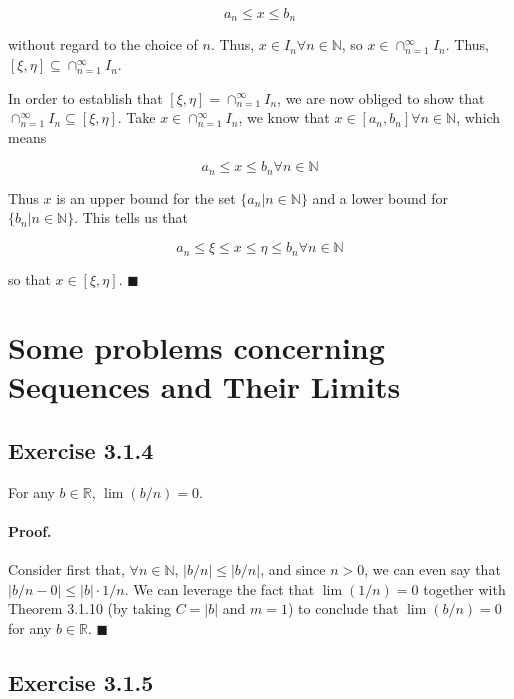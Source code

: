 \documentclass[paper=a4, fontsize=11pt]{scrartcl} %
\numberwithin{equation}{section} %
\numberwithin{figure}{section} %
\numberwithin{table}{section} %
\begin{document}
\begin{equation}
a_n \leq x \leq b_n
\end{equation}

without regard to the choice of $n$. Thus, $x \in I_n \forall n \in \mathbb{N}$, so $x \in \cap_{n=1}^{\infty} I_n$. Thus, $[\xi, \eta] \subseteq \cap_{n=1}^{\infty} I_n$.

\newcommand{\xieta}{[\xi,\eta]}
\newcommand{\capin}{\cap_{n=1}^{\infty} I_n}
\newcommand{\fanin}{\forall n \in \mathbb{N}}
In order to establish that $\xieta = \capin$, we are now obliged to show that $\capin \subseteq \xieta$. Take $x \in \capin$, we know that $x \in [a_n, b_n] \fanin$, which means

\begin{equation}
a_n \leq x \leq b_n \fanin
\end{equation}

Thus $x$ is an upper bound for the set $\{a_n | n \in \mathbb{N}\}$ and a lower bound for $\{b_n | n \in \mathbb{N}\}$. This tells us that

\begin{equation}
a_n \leq \xi \leq x \leq \eta \leq b_n \fanin
\end{equation}

so that $x \in \xieta$. $\blacksquare$\\

\section{Some problems concerning Sequences and Their Limits}

\subsection*{Exercise 3.1.4}

For any $b \in \mathbb{R}$, $\lim(b/n) = 0$. 

\paragraph{Proof.} Consider first that, $\fanin$, $|b/n| \leq |b/n|$, and since $n > 0$, we can even say that $|b/n - 0| \leq |b| \cdot 1/n$. We can leverage the fact that $\lim(1/n)=0$ together with Theorem 3.1.10 (by taking $C=|b|$ and $m=1$) to conclude that $\lim(b/n)=0$ for any $b \in \mathbb{R}$. $\blacksquare$\\

\subsection*{Exercise 3.1.5}
\end{document}

